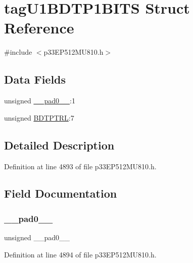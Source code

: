 \hypertarget{structtag_u1_b_d_t_p1_b_i_t_s}{}\section{tag\+U1\+B\+D\+T\+P1\+B\+I\+TS Struct Reference}
\label{structtag_u1_b_d_t_p1_b_i_t_s}


{\ttfamily \#include $<$p33\+E\+P512\+M\+U810.\+h$>$}

\subsection*{Data Fields}
\begin{DoxyCompactItemize}
\item 
unsigned \hyperlink{structtag_u1_b_d_t_p1_b_i_t_s_adf71f3d8410c1f1dbbc96680a92c49af}{\+\_\+\+\_\+pad0\+\_\+\+\_\+}\+:1
\item 
unsigned \hyperlink{structtag_u1_b_d_t_p1_b_i_t_s_a4938826201aaa21c8b228d5e369a4221}{B\+D\+T\+P\+T\+RL}\+:7
\end{DoxyCompactItemize}


\subsection{Detailed Description}


Definition at line 4893 of file p33\+E\+P512\+M\+U810.\+h.



\subsection{Field Documentation}
\mbox{\label{structtag_u1_b_d_t_p1_b_i_t_s_adf71f3d8410c1f1dbbc96680a92c49af}} 
\subsubsection{\texorpdfstring{\+\_\+\+\_\+pad0\+\_\+\+\_\+}{\_\_pad0\_\_}}
{\footnotesize\ttfamily unsigned \+\_\+\+\_\+pad0\+\_\+\+\_\+}



Definition at line 4894 of file p33\+E\+P512\+M\+U810.\+h.

